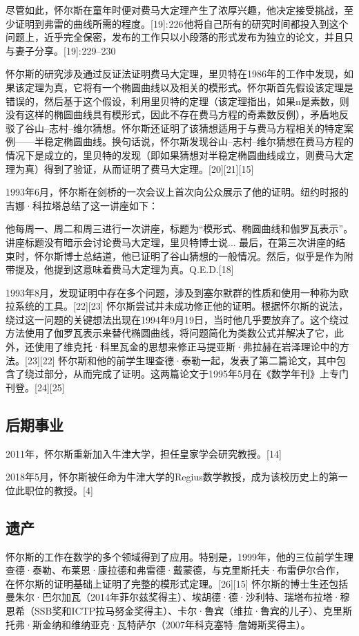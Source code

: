 尽管如此，怀尔斯在童年时便对费马大定理产生了浓厚兴趣，他决定接受挑战，至少证明到弗雷的曲线所需的程度。[19]: 226 他将自己所有的研究时间都投入到这个问题上，近乎完全保密，发布的工作只以小段落的形式发布为独立的论文，并且只与妻子分享。[19]: 229–230 

怀尔斯的研究涉及通过反证法证明费马大定理，里贝特在1986年的工作中发现，如果该定理为真，它将有一个椭圆曲线以及相关的模形式。怀尔斯首先假设该定理是错误的，然后基于这个假设，利用里贝特的定理（该定理指出，如果n是素数，则没有这样的椭圆曲线具有模形式，因此不存在费马方程的奇素数反例），矛盾地反驳了谷山–志村–维尔猜想。怀尔斯还证明了该猜想适用于与费马方程相关的特定案例——半稳定椭圆曲线。换句话说，怀尔斯发现谷山–志村–维尔猜想在费马方程的情况下是成立的，里贝特的发现（即如果猜想对半稳定椭圆曲线成立，则费马大定理为真）得到了验证，从而证明了费马大定理。[20][21][15]

1993年6月，怀尔斯在剑桥的一次会议上首次向公众展示了他的证明。纽约时报的吉娜·科拉塔总结了这一讲座如下：

他每周一、周二和周三进行一次讲座，标题为“模形式、椭圆曲线和伽罗瓦表示”。讲座标题没有暗示会讨论费马大定理，里贝特博士说... 最后，在第三次讲座的结束时，怀尔斯博士总结道，他已证明了谷山猜想的一般情况。然后，似乎是作为附带提及，他提到这意味着费马大定理为真。Q.E.D.[18]

1993年8月，发现证明中存在多个问题，涉及到塞尔默群的性质和使用一种称为欧拉系统的工具。[22][23] 怀尔斯尝试并未成功修正他的证明。根据怀尔斯的说法，绕过这一问题的关键想法出现在1994年9月19日，当时他几乎要放弃了。这个绕过方法使用了伽罗瓦表示来替代椭圆曲线，将问题简化为类数公式并解决了它，此外，还使用了维克托·科里瓦金的思想来修正马提亚斯·弗拉赫在岩泽理论中的方法。[23][22] 怀尔斯和他的前学生理查德·泰勒一起，发表了第二篇论文，其中包含了绕过部分，从而完成了证明。这两篇论文于1995年5月在《数学年刊》上专门刊登。[24][25]
\subsection{后期事业}
2011年，怀尔斯重新加入牛津大学，担任皇家学会研究教授。[14]

2018年5月，怀尔斯被任命为牛津大学的Regius数学教授，成为该校历史上的第一位此职位的教授。[4]
\subsection{遗产}  
怀尔斯的工作在数学的多个领域得到了应用。特别是，1999年，他的三位前学生理查德·泰勒、布莱恩·康拉德和弗雷德·戴蒙德，与克里斯托夫·布雷伊尔合作，在怀尔斯的证明基础上证明了完整的模形式定理。[26][15] 怀尔斯的博士生还包括曼朱尔·巴尔加瓦（2014年菲尔兹奖得主）、埃胡德·德·沙利特、瑞塔布拉塔·穆恩希（SSB奖和ICTP拉马努金奖得主）、卡尔·鲁宾（维拉·鲁宾的儿子）、克里斯托弗·斯金纳和维纳亚克·瓦特萨尔（2007年科克塞特–詹姆斯奖得主）。

